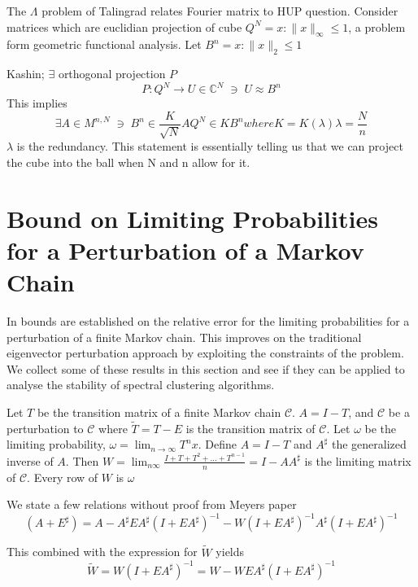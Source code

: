 \documentclass[a4paper]{article}
\newcommand{\Complex}{\mathbb C}
\theoremstyle{plain}
\theoremstyle{definition}
\theoremstyle{remark}
\newcommand{\st}{\; \ni \;}
\numberwithin{equation}{section}
\begin{document}
The $\Lambda$ problem of Talingrad relates Fourier matrix to HUP question.  Consider matrices which are euclidian projection of cube $Q^N = {x : \parallel x \parallel_\infty  \leq 1}$, a problem form geometric functional analysis.  Let $B^n = {x : \parallel x \parallel_2  \leq 1}$

Kashin; $\exists$ orthogonal projection $P$
\begin{equation*}
  P : Q^N \rightarrow U \in \Complex^N \st U \approx B^n
\end{equation*}
This implies
\begin{equation*}
  \exists A \in M^{n,N} \st B^n \in \frac{K}{\sqrt{N}} A Q^N \in K B^n where K = K(\lambda) \lambda=\frac{N}{n}
\end{equation*}
$\lambda$ is the redundancy.  This statement is essentially telling us that we can project the cube into the ball when N and n allow for it.



\section{Bound on Limiting Probabilities for a Perturbation of a Markov Chain}
In \cite{meyer1980condition} bounds are established on the relative error for the limiting probabilities for a perturbation of a finite Markov chain.  This improves on the traditional eigenvector perturbation approach by exploiting the constraints of the problem.  We collect some of these results in this section and see if they can be applied to analyse the stability of spectral clustering algorithms.

Let $T$ be the transition matrix of a finite Markov chain $\mathcal{C}$. $A=I-T$, and $\mathcal{C}$ be a perturbation to $\mathcal{C}$ where $\tilde{T} =T-E$ is the transition matrix of  $\mathcal{C}$. Let $\omega$ be the limiting probability, $\omega = \lim_{n \to \infty} T^n x$. Define $A=I-T$ and $A^\sharp$ the generalized inverse of $A$. Then $W=\lim_{n  \infty} \frac{I+T+T^2 + \ldots + T^{n-1}}{n} = I-A A^\sharp$ is the limiting matrix of $\mathcal{C}$.  Every row of $W$ is $\omega$

We state a few relations without proof from Meyers paper
\begin{equation*}
(A+E^\sharp)=A - A^\sharp E A^\sharp (I+ E A^\sharp)^{-1} - W(I+E A^\sharp)^{-1} A^\sharp (I+E A^\sharp)^{-1}
\end{equation*}

This combined with the expression for $\tilde{W}$ yields
\begin{equation*}
\tilde{W} = W(I+E A^\sharp)^{-1} = W - W E A^\sharp (I + E A^\sharp)^{-1}
\end{equation*}
\end{document}
